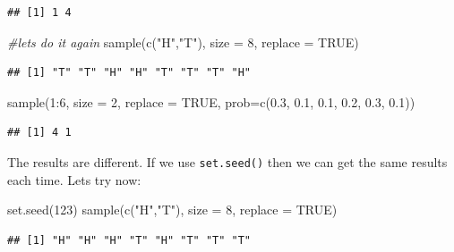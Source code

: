 \documentclass[
]{book}
\newenvironment{Shaded}{\begin{snugshade}}{\end{snugshade}}
\newcommand{\AttributeTok}[1]{\textcolor[rgb]{0.77,0.63,0.00}{#1}}
\newcommand{\CommentTok}[1]{\textcolor[rgb]{0.56,0.35,0.01}{\textit{#1}}}
\newcommand{\ConstantTok}[1]{\textcolor[rgb]{0.00,0.00,0.00}{#1}}
\newcommand{\DecValTok}[1]{\textcolor[rgb]{0.00,0.00,0.81}{#1}}
\newcommand{\FloatTok}[1]{\textcolor[rgb]{0.00,0.00,0.81}{#1}}
\newcommand{\FunctionTok}[1]{\textcolor[rgb]{0.00,0.00,0.00}{#1}}
\newcommand{\NormalTok}[1]{#1}
\newcommand{\SpecialCharTok}[1]{\textcolor[rgb]{0.00,0.00,0.00}{#1}}
\newcommand{\StringTok}[1]{\textcolor[rgb]{0.31,0.60,0.02}{#1}}
\begin{document}
\begin{verbatim}
## [1] 1 4
\end{verbatim}

\begin{Shaded}
\begin{Highlighting}[]
\CommentTok{\#let\textquotesingle{}s do it again}
\FunctionTok{sample}\NormalTok{(}\FunctionTok{c}\NormalTok{(}\StringTok{"H"}\NormalTok{,}\StringTok{"T"}\NormalTok{), }\AttributeTok{size =} \DecValTok{8}\NormalTok{, }\AttributeTok{replace =} \ConstantTok{TRUE}\NormalTok{)  }
\end{Highlighting}
\end{Shaded}

\begin{verbatim}
## [1] "T" "T" "H" "H" "T" "T" "T" "H"
\end{verbatim}

\begin{Shaded}
\begin{Highlighting}[]
\FunctionTok{sample}\NormalTok{(}\DecValTok{1}\SpecialCharTok{:}\DecValTok{6}\NormalTok{, }\AttributeTok{size =} \DecValTok{2}\NormalTok{, }\AttributeTok{replace =} \ConstantTok{TRUE}\NormalTok{, }\AttributeTok{prob=}\FunctionTok{c}\NormalTok{(}\FloatTok{0.3}\NormalTok{, }\FloatTok{0.1}\NormalTok{, }\FloatTok{0.1}\NormalTok{, }\FloatTok{0.2}\NormalTok{, }\FloatTok{0.3}\NormalTok{, }\FloatTok{0.1}\NormalTok{))}
\end{Highlighting}
\end{Shaded}

\begin{verbatim}
## [1] 4 1
\end{verbatim}

The results are different. If we use \texttt{set.seed()} then we can get the same results each time. Lets try now:

\begin{Shaded}
\begin{Highlighting}[]
\FunctionTok{set.seed}\NormalTok{(}\DecValTok{123}\NormalTok{)}
\FunctionTok{sample}\NormalTok{(}\FunctionTok{c}\NormalTok{(}\StringTok{"H"}\NormalTok{,}\StringTok{"T"}\NormalTok{), }\AttributeTok{size =} \DecValTok{8}\NormalTok{, }\AttributeTok{replace =} \ConstantTok{TRUE}\NormalTok{)  }
\end{Highlighting}
\end{Shaded}

\begin{verbatim}
## [1] "H" "H" "H" "T" "H" "T" "T" "T"
\end{verbatim}
\end{document}
